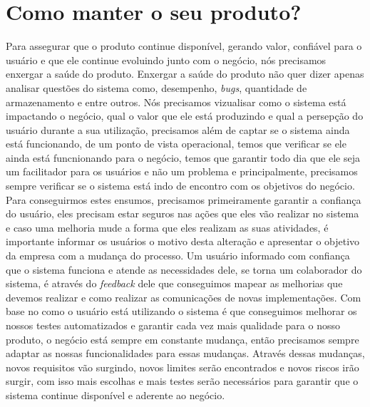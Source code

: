   \chapter{Como manter o seu produto?}
    Para assegurar que o produto continue disponível, gerando valor, confiável
    para o usuário e que ele continue evoluindo junto com o negócio, nós
    precisamos enxergar a saúde do produto. Enxergar a saúde do produto não quer
    dizer apenas analisar questões do sistema como, desempenho, \textit{bugs},
    quantidade de armazenamento e entre outros. Nós precisamos vizualisar como o
    sistema está impactando o negócio, qual o valor que ele está produzindo e
    qual a persepção do usuário durante a sua utilização, precisamos além de
    captar se o sistema ainda está funcionando, de um ponto de vista operacional,
    temos que verificar se ele ainda está funcnionando para o negócio, temos que
    garantir todo dia que ele seja um facilitador para os usuários e não um
    problema e principalmente, precisamos sempre verificar se o sistema está indo
    de encontro com os objetivos do negócio. \newline
    Para conseguirmos estes ensumos, precisamos primeiramente garantir a confiança
    do usuário, eles precisam estar seguros nas ações que eles vão realizar no
    sistema e caso uma melhoria mude a forma que eles realizam as suas atividades,
    é importante informar os usuários o motivo desta alteração e apresentar o
    objetivo da empresa com a mudança do processo. Um usuário informado com
    confiança que o sistema funciona e atende as necessidades dele, se torna
    um colaborador do sistema, é através do \textit{feedback} dele que conseguimos
    mapear as melhorias que devemos realizar e como realizar as comunicações de
    novas implementações. Com base no como o usuário está utilizando o sistema
    é que conseguimos melhorar os nossos testes automatizados e garantir cada vez
    mais qualidade para o nosso produto, o negócio está sempre em constante
    mudança, então precisamos sempre adaptar as nossas funcionalidades para essas
    mudanças. Através dessas mudanças, novos requisitos vão surgindo, novos
    limites serão encontrados e novos riscos irão surgir, com isso mais escolhas
    e mais testes serão necessários para garantir que o sistema continue
    disponível e aderente ao negócio.

